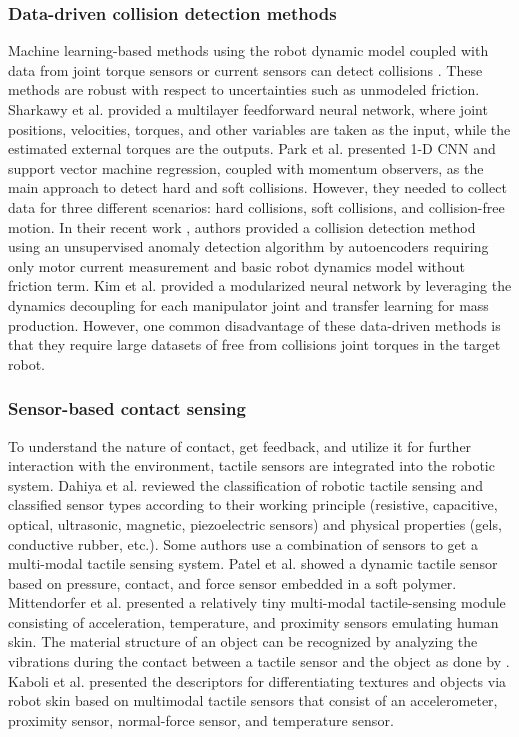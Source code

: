 \documentclass[lettersize,journal]{IEEEtran}
\begin{document}
\subsubsection{Data-driven collision detection methods}
Machine learning-based methods using the robot dynamic model coupled with data from joint torque sensors or current sensors can detect collisions  \cite{park2020learning}. These methods are robust with respect to uncertainties such as unmodeled friction. 
Sharkawy et al. \cite{sharkawy2020human} provided a multilayer feedforward neural network, where joint positions, velocities, torques, and other variables are taken as the input, while the estimated external torques are the outputs. Park et al. \cite{park2020learning} presented 1-D CNN and support vector machine regression, coupled with momentum observers, as the main approach to detect hard and soft collisions. However, they needed to collect data for three different scenarios: hard collisions, soft collisions, and collision-free motion. In their recent work \cite{park2021collision}, authors provided a collision detection method using an unsupervised anomaly detection algorithm by autoencoders requiring only motor current measurement and basic robot dynamics model without friction term. Kim et al. \cite{kim2021transferable} provided a modularized neural network by leveraging the dynamics decoupling for each manipulator joint and transfer learning for mass production. However, one common disadvantage of these data-driven methods is that they require large datasets of free from collisions joint torques in the target robot.



\subsubsection{Sensor-based contact sensing} 
To understand the nature of contact, get feedback, and utilize it for further interaction with the environment, tactile sensors are integrated into the robotic system. Dahiya et al. \cite{dahiya2009tactile} reviewed the classification of robotic tactile sensing and classified sensor types according to their working principle (resistive, capacitive, optical, ultrasonic, magnetic, piezoelectric sensors) and physical properties (gels, conductive rubber, etc.). Some authors use a combination of sensors to get a multi-modal tactile sensing system. Patel et al. \cite{patel2018integrated} showed a dynamic tactile sensor based on pressure, contact, and force sensor embedded in a soft polymer. Mittendorfer et al. \cite{mittendorfer2011humanoid} presented a relatively tiny multi-modal tactile-sensing module consisting of acceleration, temperature, and proximity sensors emulating human skin. The material structure of an object can be recognized by analyzing the vibrations during the contact between a tactile sensor and the object as done by \cite{sandykbayeva2022vibrotouch}. Kaboli et al. \cite{kaboli2018robust} presented the descriptors for differentiating textures and objects via robot skin based on multimodal tactile sensors that consist of an accelerometer, proximity sensor, normal-force sensor, and temperature sensor.
\end{document}
